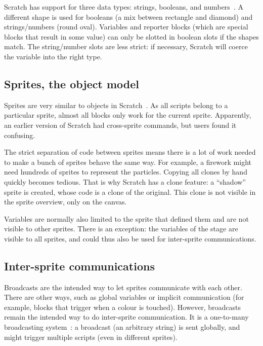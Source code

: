 \documentclass[../main]{subfiles}
\begin{document}
Scratch has support for three data types: strings, booleans, and numbers~\autocite{maloneyScratchProgrammingLanguage2010a}.
A different shape is used for booleans (a mix between rectangle and diamond) and strings/numbers (round oval).
Variables and reporter blocks (which are special blocks that result in some value) can only be slotted in boolean slots if the shapes match.
The string/number slots are less strict: if necessary, Scratch will coerce the variable into the right type.

\subsection{Sprites, the object model}\label{subsec:sprites-the-object-model}

Sprites are very similar to objects in Scratch~\autocite{maloneyScratchProgrammingLanguage2010a}.
As all scripts belong to a particular sprite, almost all blocks only work for the current sprite.
Apparently, an earlier version of Scratch had cross-sprite commands, but users found it confusing.

The strict separation of code between sprites means there is a lot of work needed to make a bunch of sprites behave the same way.
For example, a firework might need hundreds of sprites to represent the particles.
Copying all clones by hand quickly becomes tedious.
That is why Scratch has a clone feature: a ``shadow'' sprite is created, whose code is a clone of the original.
This clone is not visible in the sprite overview, only on the canvas.

Variables are normally also limited to the sprite that defined them and are not visible to other sprites.
There is an exception: the variables of the stage are visible to all sprites, and could thus also be used for inter-sprite communications.

\subsection{Inter-sprite communications}\label{subsec:intersprite-communications}

\textcolor{screvent}{Broadcasts} are the intended way to let sprites communicate with each other.
There are other ways, such as global variables or implicit communication (for example, blocks that trigger when a colour is touched).
However, broadcasts remain the intended way to do inter-sprite communication.
It is a one-to-many broadcasting system~\autocite{maloneyScratchProgrammingLanguage2010a}: a broadcast (an arbitrary string) is sent globally, and might trigger multiple scripts (even in different sprites).
\end{document}
